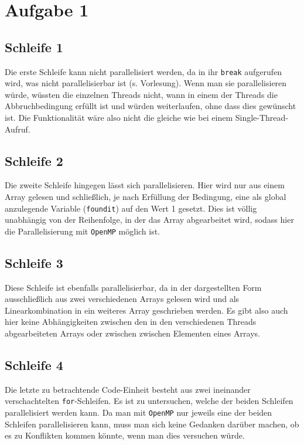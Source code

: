 \section*{Aufgabe 1}
\subsection*{Schleife 1}

Die erste Schleife kann nicht parallelisiert werden, da in ihr \texttt{break}
aufgerufen wird, was nicht parallelisierbar ist (s. Vorlesung). Wenn man sie parallelisieren
würde, wüssten die einzelnen Threads nicht, wann in einem der Threads die Abbruchbedingung 
erfüllt ist und würden weiterlaufen, ohne dass dies gewünscht ist. Die Funktionalität
wäre also nicht die gleiche wie bei einem Single-Thread-Aufruf.

\subsection*{Schleife 2}

Die zweite Schleife hingegen lässt sich parallelisieren. Hier wird nur aus einem
Array gelesen und schließlich, je nach Erfüllung der Bedingung, eine als global
anzulegende Variable (\texttt{foundit}) auf den Wert 1 gesetzt. Dies ist völlig
unabhängig von der Reihenfolge, in der das Array abgearbeitet wird, sodass hier
die Parallelisierung mit \texttt{OpenMP} möglich ist.

\subsection*{Schleife 3}

Diese Schleife ist ebenfalls parallelisierbar, da in der dargestellten Form ausschließlich
aus zwei verschiedenen Arrays gelesen wird und als Linearkombination in ein weiteres
Array geschrieben werden. Es gibt also auch hier keine Abhängigkeiten zwischen
den in den verschiedenen Threads abgearbeiteten Arrays oder zwischen zwischen Elementen
eines Arrays.

\subsection*{Schleife 4}

Die letzte zu betrachtende Code-Einheit besteht aus zwei ineinander verschachtelten
\texttt{for}-Schleifen. Es ist zu untersuchen, welche der beiden Schleifen parallelisiert
werden kann. Da man mit \texttt{OpenMP} nur jeweils eine der beiden Schleifen parallelisieren
kann, muss man sich keine Gedanken darüber machen, ob es zu Konflikten kommen könnte,
wenn man dies versuchen würde.

